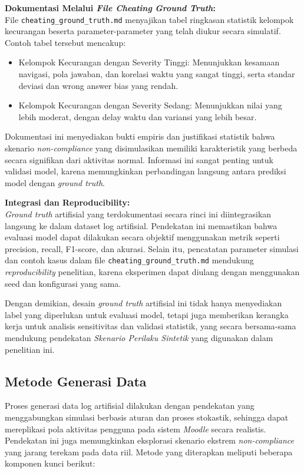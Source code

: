 \textbf{Dokumentasi Melalui \textit{File Cheating} \textit{Ground Truth}:} \\
File \texttt{cheating\_ground\_truth.md} menyajikan tabel ringkasan statistik kelompok kecurangan beserta parameter-parameter yang telah diukur secara simulatif. Contoh tabel tersebut mencakup:
\begin{itemize}
    \item Kelompok Kecurangan dengan Severity Tinggi: Menunjukkan kesamaan navigasi, pola jawaban, dan korelasi waktu yang sangat tinggi, serta standar deviasi dan wrong answer bias yang rendah.
    \item Kelompok Kecurangan dengan Severity Sedang: Menunjukkan nilai yang lebih moderat, dengan delay waktu dan variansi yang lebih besar.
\end{itemize}

Dokumentasi ini menyediakan bukti empiris dan justifikasi statistik bahwa skenario \textit{non-compliance} yang disimulasikan memiliki karakteristik yang berbeda secara signifikan dari aktivitas normal. Informasi ini sangat penting untuk validasi model, karena memungkinkan perbandingan langsung antara prediksi model dengan \textit{ground truth}.

\textbf{Integrasi dan Reproducibility:} \\
\textit{Ground truth} artifisial yang terdokumentasi secara rinci ini diintegrasikan langsung ke dalam dataset log artifisial. Pendekatan ini memastikan bahwa evaluasi model dapat dilakukan secara objektif menggunakan metrik seperti precision, recall, F1-score, dan akurasi. Selain itu, pencatatan parameter simulasi dan contoh kasus dalam file \texttt{cheating\_ground\_truth.md} mendukung \textit{reproducibility} penelitian, karena eksperimen dapat diulang dengan menggunakan seed dan konfigurasi yang sama.

Dengan demikian, desain \textit{ground truth} artifisial ini tidak hanya menyediakan label yang diperlukan untuk evaluasi model, tetapi juga memberikan kerangka kerja untuk analisis sensitivitas dan validasi statistik, yang secara bersama-sama mendukung pendekatan \textit{Skenario Perilaku Sintetik} yang digunakan dalam penelitian ini.

\subsection{Metode Generasi Data}
\label{sec:metodeGenerasiData}
Proses generasi data log artifisial dilakukan dengan pendekatan yang menggabungkan simulasi berbasis aturan dan proses stokastik, sehingga dapat mereplikasi pola aktivitas pengguna pada sistem \textit{Moodle} secara realistis. Pendekatan ini juga memungkinkan eksplorasi skenario ekstrem \textit{non-compliance} yang jarang terekam pada data riil. Metode yang diterapkan meliputi beberapa komponen kunci berikut:

